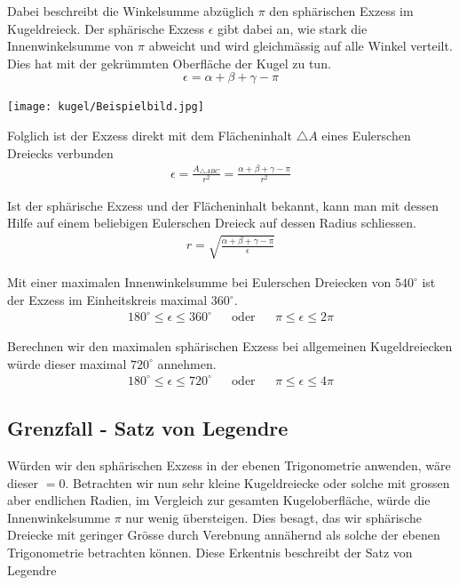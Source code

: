 \begin{refsection}
\begin{refsection}
Dabei beschreibt die Winkelsumme abzüglich $\pi$ den sphärischen Exzess im Kugeldreieck.
Der sphärische Exzess $\epsilon$ gibt dabei an, wie stark die Innenwinkelsumme von $\pi$ abweicht und wird gleichmässig auf alle Winkel verteilt. Dies hat mit der gekrümmten Oberfläche der Kugel zu tun.
\begin{equation}
\epsilon = \alpha + \beta + \gamma - \pi
\end{equation}

\begin{center}
        \texttt{[image: kugel/Beispielbild.jpg]}
\end{center}

Folglich ist der Exzess direkt mit dem Flächeninhalt $\triangle A$ eines Eulerschen Dreiecks verbunden
\begin{align*}
\epsilon =\frac{A_{\triangle{ ABC }}}{r^2} = \frac{\alpha + \beta + \gamma - \pi}{r^2}
\end{align*}

Ist der sphärische Exzess und der Flächeninhalt bekannt, kann man mit dessen Hilfe auf einem beliebigen Eulerschen Dreieck auf dessen Radius schliessen.
\begin{align*}
r = \sqrt{\frac{\alpha + \beta + \gamma - \pi}{\epsilon}}
\end{align*}

Mit einer maximalen Innenwinkelsumme bei Eulerschen Dreiecken von $540^{\circ}$ ist der Exzess im Einheitskreis maximal $360^{\circ}$.
\[
\begin{aligned}
180^{\circ} \le \epsilon \le 360^{\circ}
&
&\text{oder}
&
&\pi \le \epsilon \le 2\pi
\end{aligned}
\]

Berechnen wir den maximalen sphärischen Exzess bei allgemeinen Kugeldreiecken würde dieser maximal $720^{\circ}$ annehmen.
\[
\begin{aligned}
180^{\circ} \le \epsilon \le 720^{\circ}
&
&\text{oder}
&
&\pi \le \epsilon \le 4\pi
\end{aligned}
\]



\subsection{Grenzfall - Satz von Legendre}
Würden wir den sphärischen Exzess in der ebenen Trigonometrie anwenden, wäre dieser $=0$. Betrachten wir nun sehr kleine Kugeldreiecke oder solche mit grossen aber endlichen Radien, im Vergleich zur gesamten Kugeloberfläche, würde die Innenwinkelsumme $\pi$ nur wenig übersteigen. Dies besagt, das wir sphärische Dreiecke mit geringer Grösse durch Verebnung annähernd als solche der ebenen Trigonometrie betrachten können. Diese Erkentnis beschreibt der Satz von Legendre


\end{refsection}
\end{refsection}
